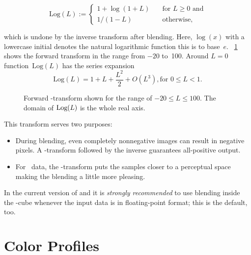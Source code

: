 \begin{equation}\label{equ:log-transform}
  \mbox{Log}(L) :=
  \left\{
  \begin{array}{ll}
    1 + \log(1 + L) & \quad \mbox{for } L \geq 0 \mbox{ and} \\
    1 / (1 - L)     & \quad \mbox{otherwise,}
  \end{array}
  \right.
\end{equation}

\noindent which is undone by the inverse transform after blending.  Here, $\log(x)$ with a
lowercase initial denotes the natural logarithmic function this is to base~$e$.
\figureName~\ref{fig:log-transform} shows the forward transform in the range from $-20$ to~100.
Around $L = 0$ function~$\mbox{Log}(L)$ has the series expansion
\[
\mbox{Log}(L) = 1 + L + \frac{L^2}{2} + O(L^3), \mbox{for } 0 \leq L < 1.
\]

\begin{figure}
  \centering

  \caption[\LogTransform-transform]%
          {\label{fig:log-transform}%
            Forward \LogTransform-transform shown for the range of $-20 \leq L \leq 100$.  The
            domain of $\mbox{Log}(L)$ is the whole real axis.}
\end{figure}

This transform serves two purposes:

\begin{itemize}
\item
  During blending, even completely nonnegative images can result in negative pixels.  A
  \LogTransform-transform followed by the inverse guarantees all-positive output.

\item
  For ~data, the \LogTransform-transform puts the samples closer to a perceptual
  space making the blending a little more pleasing.
\end{itemize}

In the current version of \App{} and \OtherApp{} it is \emph{strongly recommended} to use
blending inside the -cube whenever the input data is in floating-point format; this
is the default, too.


\section[Color Profiles]{\label{sec:color-profiles}%
  Color Profiles}

